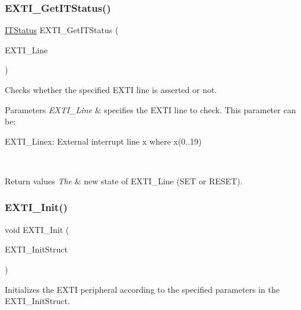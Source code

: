 \subsubsection{\texorpdfstring{EXTI\_GetITStatus()}{EXTI\_GetITStatus()}}
{\footnotesize\ttfamily \mbox{\hyperlink{group___exported__types_gaacbd7ed539db0aacd973a0f6eca34074}{I\+T\+Status}} E\+X\+T\+I\+\_\+\+Get\+I\+T\+Status (\begin{DoxyParamCaption}\item[{uint32\+\_\+t}]{E\+X\+T\+I\+\_\+\+Line }\end{DoxyParamCaption})}



Checks whether the specified E\+X\+TI line is asserted or not. 


\begin{DoxyParams}{Parameters}
{\em E\+X\+T\+I\+\_\+\+Line} & specifies the E\+X\+TI line to check. This parameter can be\+: \begin{DoxyItemize}
\item E\+X\+T\+I\+\_\+\+Linex\+: External interrupt line x where x(0..19) \end{DoxyItemize}
\\
\hline
\end{DoxyParams}

\begin{DoxyRetVals}{Return values}
{\em The} & new state of E\+X\+T\+I\+\_\+\+Line (S\+ET or R\+E\+S\+ET). \\
\hline
\end{DoxyRetVals}
\mbox{\label{group___e_x_t_i___private___functions_ga8c9ce6352a3a2dfc8fc9287cb24c6501}} 
\subsubsection{\texorpdfstring{EXTI\_Init()}{EXTI\_Init()}}
{\footnotesize\ttfamily void E\+X\+T\+I\+\_\+\+Init (\begin{DoxyParamCaption}\item[{\mbox{\hyperlink{struct_e_x_t_i___init_type_def}{E\+X\+T\+I\+\_\+\+Init\+Type\+Def}} $\ast$}]{E\+X\+T\+I\+\_\+\+Init\+Struct }\end{DoxyParamCaption})}



Initializes the E\+X\+TI peripheral according to the specified parameters in the E\+X\+T\+I\+\_\+\+Init\+Struct. 


